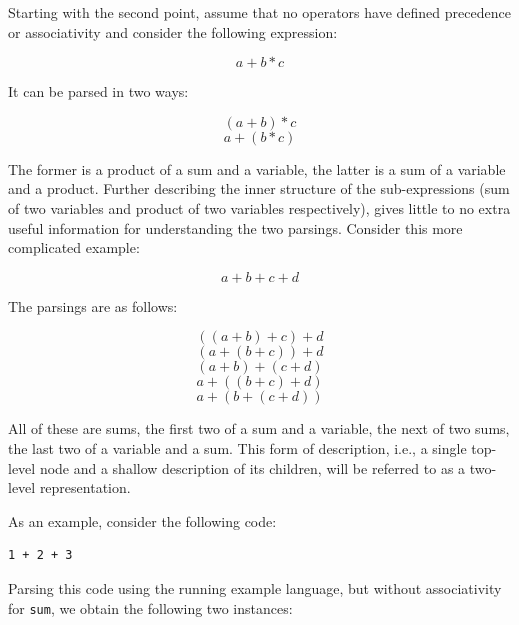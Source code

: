 \documentclass{kththesis}
\begin{document}
Starting with the second point, assume that no operators have defined precedence or associativity and consider the following expression:

$$ a + b * c $$

It can be parsed in two ways:

$$ (a + b) * c $$
$$ a + (b * c) $$

The former is a product of a sum and a variable, the latter is a sum of a variable and a product. Further describing the inner structure of the sub-expressions (sum of two variables and product of two variables respectively), gives little to no extra useful information for understanding the two parsings. Consider this more complicated example:

$$ a + b + c + d $$

The parsings are as follows:

$$ ((a + b) + c) + d $$
$$ (a + (b + c)) + d $$
$$ (a + b) + (c + d) $$
$$ a + ((b + c) + d) $$
$$ a + (b + (c + d)) $$

All of these are sums, the first two of a sum and a variable, the next of two sums, the last two of a variable and a sum. This form of description, i.e., a single top-level node and a shallow description of its children, will be referred to as a two-level representation.

As an example, consider the following code:

\begin{verbatim}
1 + 2 + 3
\end{verbatim}

Parsing this code using the running example language, but without associativity for \texttt{sum}, we obtain the following two instances:
\end{document}
